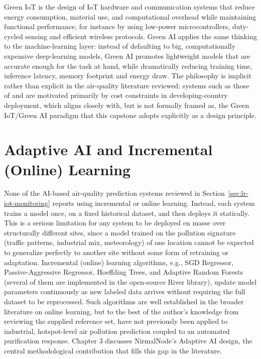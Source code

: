 Green IoT is the design of IoT hardware and communication systems that reduce energy consumption, material use, and computational overhead while maintaining functional performance, for instance by using low-power microcontrollers, duty-cycled sensing and efficient wireless protocols. Green AI applies the same thinking to the machine-learning layer: instead of defaulting to big, computationally expensive deep-learning models, Green AI promotes lightweight models that are accurate enough for the task at hand, while dramatically reducing training time, inference latency, memory footprint and energy draw. The philosophy is implicit rather than explicit in the air-quality literature reviewed: systems such as those of \citet{alam2025iot} and \citet{shabbir2025paradigm} are motivated primarily by cost constraints in developing-country deployment, which aligns closely with, but is not formally framed as, the Green IoT/Green AI paradigm that this capstone adopts explicitly as a design principle.

\section{Adaptive AI and Incremental (Online) Learning}
\label{sec:lr-adaptive-ai}

None of the AI-based air-quality prediction systems reviewed in Section~\ref{sec:lr-iot-monitoring} reports using incremental or online learning. Instead, each system trains a model once, on a fixed historical dataset, and then deploys it statically. This is a serious limitation for any system to be deployed en masse over structurally different sites, since a model trained on the pollution signature (traffic patterns, industrial mix, meteorology) of one location cannot be expected to generalize perfectly to another site without some form of retraining or adaptation. Incremental (online) learning algorithms, e.g., SGD Regressor, Passive-Aggressive Regressor, Hoeffding Trees, and Adaptive Random Forests (several of them are implemented in the open-source River library), update model parameters continuously as new labeled data arrives without requiring the full dataset to be reprocessed. Such algorithms are well established in the broader literature on online learning, but to the best of the author’s knowledge from reviewing the supplied reference set, have not previously been applied to industrial, hotspot-level air pollution prediction coupled to an automated purification response. Chapter 3 discusses NirmalNode’s Adaptive AI design, the central methodological contribution that fills this gap in the literature.
